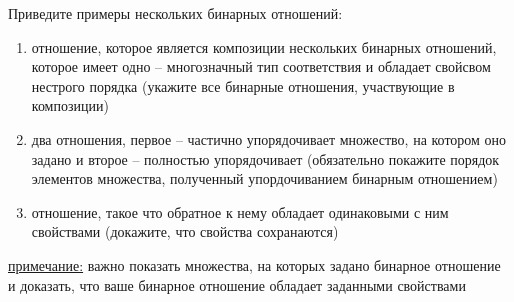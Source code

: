 \question
Приведите  примеры  нескольких бинарных отношений:
\begin{enumerate}
	\renewcommand{\labelenumi}{\alph{enumi})}
	\item отношение, которое является композиции нескольких бинарных отношений,  которое имеет  одно -- многозначный тип соответствия  и обладает свойсвом нестрого порядка (укажите все бинарные отношения, участвующие в композиции)
	\item два отношения, первое -- частично упорядочивает множество, на котором оно задано и второе -- полностью упорядочивает (обязательно покажите порядок элементов множества, полученный упордочиванием бинарным отношением)
	\item отношение, такое что обратное к нему  обладает одинаковыми с ним свойствами (докажите, что свойства сохранаются)
\end{enumerate}

\underline{примечание:} важно показать  множества, на которых задано бинарное отношение и доказать, что ваше бинарное отношение обладает заданными свойствами

